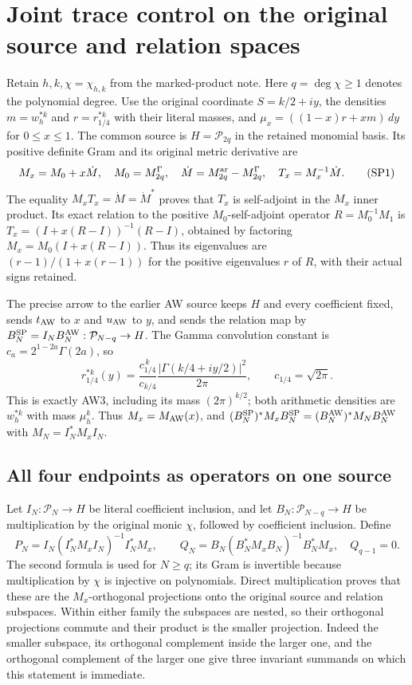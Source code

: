\section{Joint trace control on the original source and relation spaces}
\label{GraphV2:sec:signed-projection-control}

Retain \(h,k,\chi=\chi_{h,k}\) from the marked-product note. Here
\(q=\deg\chi\geq1\) denotes the polynomial degree. Use the original
coordinate \(S=k/2+iy\), the densities \(m=w_h^{*k}\) and
\(r=r_{1/4}^{*k}\) with their literal masses, and
\(\mu_x=((1-x)r+xm)\,dy\) for \(0\leq x\leq1\).
The common source is \(H=\mathcal P_{2q}\) in the retained monomial basis.
Its positive definite Gram and its original metric derivative are
\[
 M_x=M_0+x\dot M,\quad M_0=M^\Gamma_{2q},\quad
 \dot M=M^{\rm ar}_{2q}-M^\Gamma_{2q},\quad
 T_x=M_x^{-1}\dot M .
 \tag{SP1}
\]
The equality \(M_xT_x=\dot M=\dot M^*\) proves that \(T_x\) is
self-adjoint in the \(M_x\) inner product. Its exact relation to
the positive \(M_0\)-self-adjoint operator \(R=M_0^{-1}M_1\) is
\(T_x=(I+x(R-I))^{-1}(R-I)\), obtained by factoring
\(M_x=M_0(I+x(R-I))\). Thus its eigenvalues are
\((r-1)/(1+x(r-1))\) for the positive eigenvalues \(r\) of \(R\),
with their actual signs retained.

The precise arrow to the earlier AW source keeps $H$ and every
coefficient fixed, sends $t_{\rm AW}$ to $x$ and $u_{\rm AW}$ to $y$,
and sends the relation map by
$B_N^{\rm SP}=I_NB_N^{\rm AW}:\mathcal P_{N-q}\to H$.
The Gamma convolution constant is
$c_a=2^{1-2a}\Gamma(2a)$, so
\[
 r_{1/4}^{*k}(y)
 =\frac{c_{1/4}^{\,k}}{c_{k/4}}
             \frac{|\Gamma(k/4+iy/2)|^2}{2\pi},\qquad
 c_{1/4}=\sqrt{2\pi}.
 \tag{SP1a}
\]
This is exactly AW3, including its mass $(2\pi)^{k/2}$; both
arithmetic densities are $w_h^{*k}$ with mass $\mu_h^k$.
Thus $M_x=M_{\rm AW}(x)$, and
$(B_N^{\rm SP})^*M_xB_N^{\rm SP}=(B_N^{\rm AW})^*M_NB_N^{\rm AW}$
with $M_N=I_N^*M_xI_N$.


\subsection{All four endpoints as operators on one source}
Let \(I_N:\mathcal P_N\to H\) be literal coefficient inclusion, and
let \(B_N:\mathcal P_{N-q}\to H\) be multiplication by the original
monic \(\chi\), followed by coefficient inclusion. Define
\[
 P_N=I_N(I_N^*M_xI_N)^{-1}I_N^*M_x,\qquad
 Q_N=B_N(B_N^*M_xB_N)^{-1}B_N^*M_x,\quad Q_{q-1}=0 .
 \tag{SP2}
\]
The second formula is used for \(N\geq q\); its Gram is invertible
because multiplication by \(\chi\) is injective on polynomials.
Direct multiplication proves that these are the \(M_x\)-orthogonal
projections onto the original source and relation subspaces.
Within either family the subspaces are nested, so their orthogonal
projections commute and their product is the smaller projection.
Indeed the smaller subspace, its orthogonal complement inside the
larger one, and the orthogonal complement of the larger one give
three invariant summands on which this statement is immediate.

